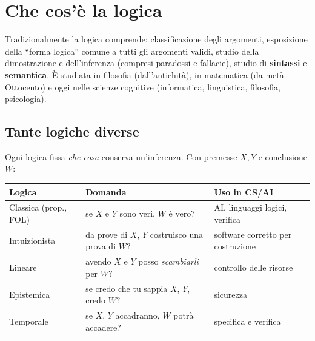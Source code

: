 \section{Che cos'è la logica}


Tradizionalmente la logica comprende: classificazione degli argomenti,
esposizione della ``forma logica'' comune a tutti gli argomenti validi, studio
della dimostrazione e dell'inferenza (compresi paradossi e fallacie), studio di
\textbf{sintassi} e \textbf{semantica}. È studiata in filosofia (dall'antichità),
in matematica (da metà Ottocento) e oggi nelle scienze cognitive (informatica,
linguistica, filosofia, psicologia).

\subsection{Tante logiche diverse}

Ogni logica fissa \emph{che cosa} conserva un'inferenza. Con premesse $X, Y$ e
conclusione $W$:

\begin{center}
\begin{tabular}{lll}
\toprule
\textbf{Logica} & \textbf{Domanda} & \textbf{Uso in CS/AI} \\
\midrule
Classica (prop., FOL) & se $X$ e $Y$ sono veri, $W$ è vero? & AI, linguaggi logici, verifica \\
Intuizionista & da prove di $X$, $Y$ costruisco una prova di $W$? & software corretto per costruzione \\
Lineare & avendo $X$ e $Y$ posso \emph{scambiarli} per $W$? & controllo delle risorse \\
Epistemica & se credo che tu sappia $X$, $Y$, credo $W$? & sicurezza \\
Temporale & se $X$, $Y$ accadranno, $W$ potrà accadere? & specifica e verifica \\
\bottomrule
\end{tabular}
\end{center}


